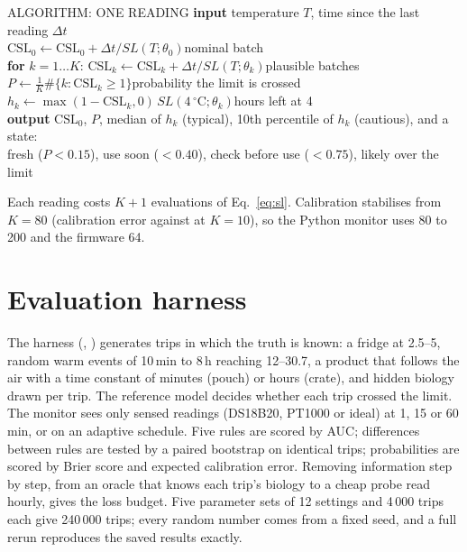 \begin{keybox}{ALGORITHM: ONE READING}
\textbf{input} temperature $T$, time since the last reading $\Delta t$\\
\quad $\mathrm{CSL}_0\leftarrow\mathrm{CSL}_0+\Delta t/SL(T;\theta_0)$\hfill nominal batch\\
\quad \textbf{for} $k=1\ldots K$: $\mathrm{CSL}_k\leftarrow\mathrm{CSL}_k+\Delta t/SL(T;\theta_k)$\hfill plausible batches\\
\quad $P\leftarrow\frac1K\#\{k:\mathrm{CSL}_k\ge1\}$\hfill probability the limit is crossed\\
\quad $h_k\leftarrow\max(1-\mathrm{CSL}_k,0)\,SL(4\,^\circ\mathrm C;\theta_k)$\hfill hours left at 4\degC\\
\textbf{output} $\mathrm{CSL}_0$, $P$, median of $h_k$ (typical), 10th percentile of $h_k$ (cautious), and a state:\\
\quad fresh ($P<0.15$), use soon ($<0.40$), check before use ($<0.75$), likely over the limit
\end{keybox}

Each reading costs $K+1$ evaluations of Eq.~\eqref{eq:sl}. Calibration stabilises from $K=80$ (calibration error \MsMcEceEighty{} against \MsMcEceTen{} at $K=10$), so the Python monitor uses 80 to 200 and the firmware 64.

\section{Evaluation harness}
The harness (, ) generates trips in which the truth is known: a fridge at 2.5--5\degC, random warm events of 10\,min to 8\,h reaching 12--30.7\degC, a product that follows the air with a time constant of minutes (pouch) or hours (crate), and hidden biology drawn per trip. The reference model decides whether each trip crossed the limit. The monitor sees only sensed readings (DS18B20, PT1000 or ideal) at 1, 15 or 60\,min, or on an adaptive schedule. Five rules are scored by AUC; differences between rules are tested by a paired bootstrap on identical trips; probabilities are scored by Brier score and expected calibration error. Removing information step by step, from an oracle that knows each trip's biology to a cheap probe read hourly, gives the loss budget. Five parameter sets of 12 settings and 4\,000 trips each give 240\,000 trips; every random number comes from a fixed seed, and a full rerun reproduces the saved results exactly.

